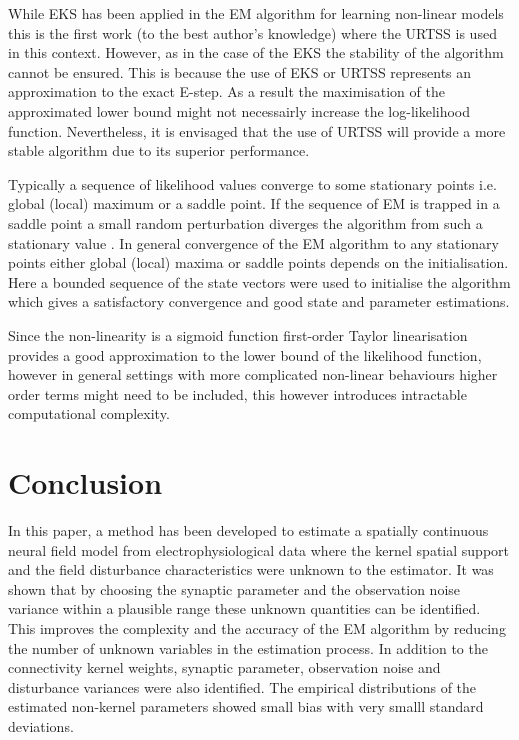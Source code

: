 \documentclass[]{article}
\begin{document}
While EKS has been  applied in the EM algorithm for learning non-linear models \cite{Ghahramani1999} this is the first work (to the best author's knowledge) where the URTSS is used in this context. However, as in the case of the EKS the stability of the algorithm cannot be ensured. This is because the use of EKS or URTSS represents an approximation to the exact E-step. As a result the maximisation of the approximated lower bound might not necessairly increase the log-likelihood function. Nevertheless, it is envisaged that the use of URTSS will provide a more stable algorithm due to its superior performance.

Typically a sequence of likelihood values converge to some stationary points i.e. global (local) maximum or a saddle point. If the sequence of EM is trapped in a saddle point a small random perturbation diverges the algorithm from such a stationary value \cite{McLachlan1997}. In general convergence of the EM algorithm to any stationary points either global (local) maxima or saddle points depends on the initialisation. Here a bounded sequence of the state vectors were used to initialise the algorithm which gives a satisfactory convergence and good state and parameter estimations.

Since the non-linearity is a sigmoid function first-order Taylor linearisation provides a good approximation to the lower bound of the likelihood function, however in general settings with more complicated non-linear behaviours higher order terms might need to be included, this however introduces intractable computational complexity.
\section{Conclusion}
In this paper, a method has been developed to estimate a spatially continuous neural field model from electrophysiological data where the kernel spatial support and the field disturbance characteristics were unknown to the estimator.  It was shown that by choosing the synaptic parameter and the observation noise variance within a plausible range these unknown quantities can be identified. This improves the complexity and the accuracy of the EM algorithm by reducing the number of unknown variables in the estimation process. In addition to the connectivity kernel weights, synaptic parameter, observation noise and disturbance variances were also identified. The empirical distributions of the estimated non-kernel parameters showed small bias with very smalll standard deviations.
\end{document}
